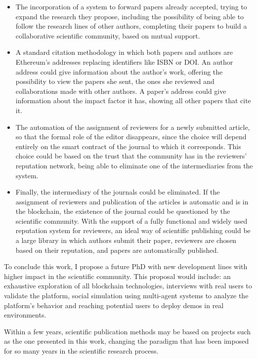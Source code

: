 \begin{itemize}
\item The incorporation of a system to forward papers already accepted, trying
  to expand the research they propose, including the possibility of being able
  to follow the research lines of other authors, completing their papers to
  build a collaborative scientific community, based on mutual support.
\item A standard citation methodology in which both papers and authors are
  Ethereum's addresses replacing identifiers like ISBN or DOI. An author address
  could give information about the author's work, offering the possibility to
  view the papers she sent, the ones she reviewed and collaborations made with
  other authors. A paper's address could give information about the impact
  factor it has, showing all other papers that cite it.
\item The automation of the assignment of reviewers for a newly submitted
  article, so that the formal role of the editor disappears, since the choice
  will depend entirely on the smart contract of the journal to which it
  corresponds. This choice could be based on the trust that the community has in
  the reviewers' reputation network, being able to eliminate one of the
  intermediaries from the system.
\item Finally, the intermediary of the journals could be eliminated. If the
  assignment of reviewers and publication of the articles is automatic and is in
  the blockchain, the existence of the journal could be questioned by the
  scientific community. With the support of a fully functional and widely used
  reputation system for reviewers, an ideal way of scientific publishing could
  be a large library in which authors submit their paper, reviewers are chosen
  based on their reputation, and papers are automatically published.
\end{itemize}

To conclude this work, I propose a future PhD with new development lines with
higher impact in the scientific community. This proposal would include: an
exhaustive exploration of all blockchain technologies, interviews with real
users to validate the platform, social simulation using multi-agent systems to
analyze the platform's behavior and reaching potential users to deploy demos in
real environments.

Within a few years, scientific publication methods may be based on projects such
as the one presented in this work, changing the paradigm that has been imposed
for so many years in the scientific research process.


